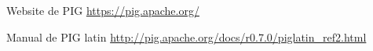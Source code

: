 % 

\begin{thebibliography}{99}


	\emph{} Website de PIG \url{https://pig.apache.org/}	

	\emph{} Manual de PIG latin \url{http://pig.apache.org/docs/r0.7.0/piglatin_ref2.html}	

	
\end{thebibliography}
